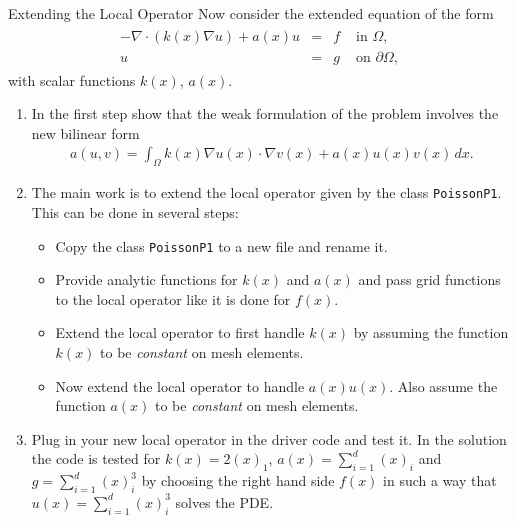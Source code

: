 \documentclass[12pt,a4paper]{article}
\begin{document}
\begin{Exercise}{Extending the Local Operator}
Now consider the extended equation of the form
\begin{align}
    \begin{array}{rcll}
      -\nabla\cdot (k(x) \nabla u) +a(x) u  & = & f & \text{ in } \Omega, \\
      u & = & g & \text{ on } \partial\Omega,
    \end{array}
\end{align}
with scalar functions $k(x)$, $a(x)$.

\begin{enumerate}
\item In the first step show that the weak formulation of the problem
  involves the new bilinear form
  \begin{align}
    a(u,v) = \int_\Omega k(x) \nabla u(x) \cdot \nabla v(x) + a(x) u(x) v(x) \,dx .
  \end{align}
\item The main work is to extend the local operator given by the class
  \lstinline{PoissonP1}. This can be done in several steps:
  \begin{itemize}
  \item Copy the class \lstinline{PoissonP1} to a new file and rename it.
  \item Provide analytic functions for $k(x)$ and $a(x)$ and pass
    grid functions to the local operator like it is done for $f(x)$.
  \item Extend the local operator to first handle $k(x)$ by assuming the
    function $k(x)$ to be \emph{constant} on mesh elements.
  \item Now extend the local operator to handle $a(x) u(x)$. Also assume
    the function $a(x)$ to be \emph{constant} on mesh elements.
  \end{itemize}
\item Plug in your new local operator in the driver code and test it.
  In the solution the code is tested for $k(x)=2(x)_1$,
  $a(x)=\sum_{i=1}^{d}(x)_i$ and $g=\sum_{i=1}^d (x)_i^3$ by choosing
  the right hand side $f(x)$ in such a way that $u(x)=\sum_{i=1}^d
  (x)_i^3$ solves the PDE.
\end{enumerate}
\end{Exercise}
\end{document}
